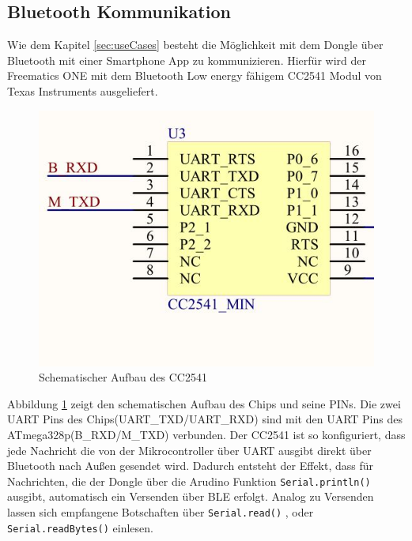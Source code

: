 \subsection{Bluetooth Kommunikation}
\label{sec:Bluetooth}
Wie dem Kapitel \ref{sec:useCases} besteht die Möglichkeit mit dem Dongle über Bluetooth mit einer Smartphone App zu kommunizieren. Hierfür wird der Freematics ONE mit dem Bluetooth Low energy fähigem CC2541 Modul von Texas Instruments ausgeliefert.
\begin{figure}[H]
  \begin{center}
    \includegraphics[scale=0.5]{./img/BLEChip.jpg}
    \caption{Schematischer Aufbau des CC2541\cite{Freematics2016}}
    \label{fig:BLEChip}
  \end{center}
\end{figure} 
Abbildung \ref{fig:BLEChip} zeigt den schematischen Aufbau des Chips und seine PINs. Die zwei UART Pins des Chips(UART\_TXD/UART\_RXD) sind mit den UART Pins des ATmega328p(B\_RXD/M\_TXD) verbunden. Der CC2541 ist so konfiguriert, dass jede Nachricht die von der Mikrocontroller über UART ausgibt direkt über Bluetooth nach Außen gesendet wird. Dadurch entsteht der Effekt, dass für Nachrichten, die der Dongle über die Arudino Funktion \texttt{Serial.println()} ausgibt, automatisch ein Versenden über BLE erfolgt. Analog zu Versenden lassen sich empfangene Botschaften über \texttt{Serial.read()} , oder \texttt{Serial.readBytes()} einlesen.

